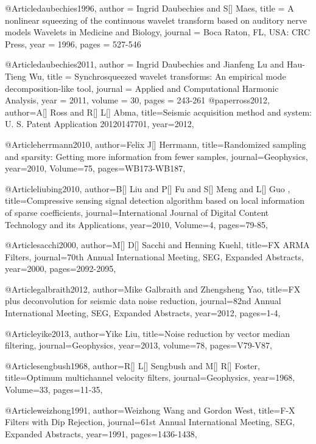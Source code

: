 {@Article{daubechies1996,
  author = 	 {Ingrid Daubechies and S[] Maes},
  title = 	 {A nonlinear squeezing of the continuous wavelet transform based on auditory nerve models Wavelets in Medicine and Biology},
  journal = 	 {Boca Raton, FL, USA: CRC Press},
  year = 	 1996,
  pages = 	 {527-546}
}

@Article{daubechies2011,
  author = 	 {Ingrid Daubechies and Jianfeng Lu and Hau-Tieng Wu},
  title = 	 {Synchrosqueezed wavelet transforms: An empirical mode decomposition-like tool},
  journal = 	 {Applied and Computational Harmonic Analysis},
  year = 	 2011,
  volume = 	 30,
  pages = 	 {243-261}
}
@paper{ross2012,
  author={A[] Ross and R[] L[] Abma},
  title={Seismic acquisition method and system: U. S. Patent Application
20120147701},
  year=2012,
}

@Article{herrmann2010,
  author={Felix J[] Herrmann},
  title={Randomized sampling and sparsity: Getting more information from fewer samples},
  journal={Geophysics},
  year=2010,
  Volume=75,
  pages={WB173-WB187},
}

@Article{liubing2010,
  author={B[] Liu and P[] Fu and S[] Meng and L[] Guo },
  title={Compressive sensing signal detection algorithm based on local information of sparse coefficients},
  journal={International Journal of Digital Content Technology and its Applications},
  year=2010,
  Volume=4,
  pages={79-85},
}


@Article{sacchi2000,
  author={M[] D[] Sacchi and Henning Kuehl},
  title={FX ARMA Filters},
  journal={70th Annual International Meeting, SEG, Expanded Abstracts},
  year=2000,
  pages={2092-2095},
}

@Article{galbraith2012,
  author={Mike Galbraith and Zhengsheng Yao},
  title={FX plus deconvolution for seismic data noise reduction},
  journal={82nd Annual International Meeting, SEG, Expanded Abstracts},
  year=2012,
  pages={1-4},
}

@Article{yike2013,
  author={Yike Liu},
  title={Noise reduction by vector median filtering},
  journal={Geophysics},
  year=2013,
  volume=78,
  pages={V79-V87},
}



@Article{sengbush1968,
  author={R[] L[] Sengbush and M[] R[] Foster},
  title={Optimum multichannel velocity filters},
  journal={Geophysics},
  year=1968,
  Volume=33,
  pages={11-35},
}

@Article{weizhong1991,
  author={Weizhong Wang and Gordon West},
  title={F-X Filters with Dip Rejection},
  journal={61st Annual International Meeting, SEG, Expanded Abstracts},
  year=1991,
  pages={1436-1438},
}

}
